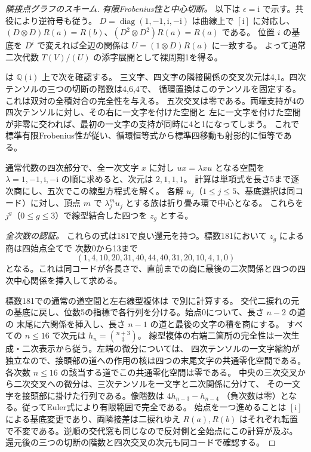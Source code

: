 \begin{proof}[隣接点グラフのスキーム]
\smallskip
\noindent\textit{有限Frobenius性と中心切断。}
以下は $\epsilon=\mathrm i$ で示す。共役により逆符号も従う。
$D=\operatorname{diag}(1,-1,\mathrm i,-\mathrm i)$ は曲線上で $[\mathrm i]$ に対応し、
$(D\otimes D)R(a)=R(b)$、$(D^2\otimes D^2)R(a)=R(a)$ である。
位置 $i$ の基底を $D^i$ で変えれば全辺の関係は $U=(1\otimes D)R(a)$ に一致する。
よって通常二次代数 $T(V)/(U)$ の添字展開として裸周期1を得る。

は $\mathbb Q(\mathrm i)$ 上で次を確認する。
三文字、四文字の隣接関係の交叉次元は4,1。四次テンソルの三つの切断の階数は4,6,4で、
循環置換はこのテンソルを固定する。これは双対の全積対合の完全性を与える。
五次交叉は零である。両端支持が4の四次テンソルに対し、その右に一文字を付けた空間と
左に一文字を付けた空間が非零に交われば、最初の一文字の支持が同時に4と1になってしまう。
これで標準有限Frobenius性が従い、循環恒等式から標準四移動も射影的に恒等である。

通常代数の四次部分で、全一次文字 $x$ に対し $u x=\lambda x u$ となる空間を
$\lambda=1,-1,\mathrm i,-\mathrm i$ の順に求めると、次元は $2,1,1,1$。
計算は単項式を長さ5まで逐次商にし、五次でこの線型方程式を解く。
各解 $u_j$（$1\le j\le5$、基底選択は同コード）に対し、頂点 $m$ で
$\lambda_j^m u_j$ とする族は折り畳み環で中心となる。
これらを $j^g$（$0\le g\le3$）で線型結合した四つを $z_g$ とする。

\smallskip
\noindent\textit{全次数の認証。}
これらの式は181で良い還元を持つ。標数181において $z_g$ による商は四始点全てで
次数0から13まで
\[
 (1,4,10,20,31,40,44,40,31,20,10,4,1,0)
\]
となる。これは同コードが各長さで、直前までの商に最後の二次関係と四つの四次中心関係を挿入して求める。

標数181での通常の道空間と左右線型複体は
で別に計算する。
交代二捩れの元の基底に戻し、位数5の指標で各行列を分ける。始点0について、長さ $n-2$ の道の
末尾に六関係を挿入し、長さ $n-1$ の道と最後の文字の積を商にする。
すべての $n\le16$ で次元は $h_n=\binom{n+3}{3}$。
線型複体の右端二箇所の完全性は一次生成・二次表示から従う。左端の微分については、
四次テンソルの一文字縮約が独立なので、接頭部の道への作用の核は四つの末尾文字の共通零化空間である。
各次数 $n\le16$ の該当する道でこの共通零化空間は零である。
中央の三次交叉から二次交叉への微分は、三次テンソルを一文字と二次関係に分けて、
その一文字を接頭部に掛けた行列である。像階数は $4h_{n-3}-h_{n-4}$
（負次数は零）となる。従ってEuler式により有限範囲で完全である。
始点を一つ進めることは $[\mathrm i]$ による基底変更であり、両隣接差は二捩れゆえ
$R(a),R(b)$ はそれぞれ転置で不変である。逆順の交代窓も同じなので反対側と全始点にこの計算が及ぶ。
還元後の三つの切断の階数と四次交叉の次元も同コードで確認する。


\end{proof}
